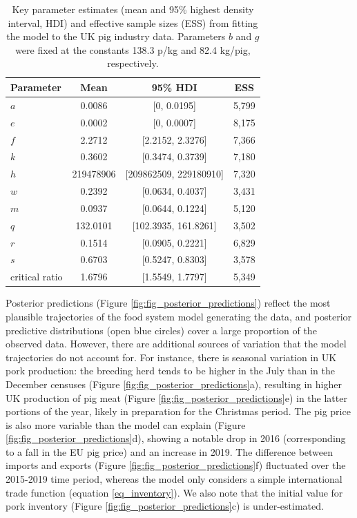 \documentclass[9pt,twocolumn,twoside,lineno]{pnas-new}
\begin{document}
\begin{table}[t!]
  \centering
  \footnotesize
  \begin{tabular}{lccc}
    \textbf{Parameter} & \textbf{Mean} & \textbf{95\% HDI} & \textbf{ESS} \\ \midrule
    $a$ & 0.0086 & [0, 0.0195] & 5,799 \\
    $e$ & 0.0002 & [0, 0.0007] & 8,175 \\
    $f$ & 2.2712 & [2.2152, 2.3276] & 7,366 \\
    $k$ & 0.3602 & [0.3474, 0.3739] & 7,180 \\
    $h$ & 219478906 & [209862509, 229180910] & 7,320 \\
    $w$ & 0.2392 & [0.0634, 0.4037] & 3,431 \\
    $m$ & 0.0937 & [0.0644, 0.1224] & 5,120 \\
    $q$ & 132.0101 & [102.3935, 161.8261] & 3,502 \\
    $r$ & 0.1514 & [0.0905, 0.2221] & 6,829 \\
    $s$ & 0.6703 & [0.5247, 0.8303] & 3,578 \\
    critical ratio & 1.6796 & [1.5549, 1.7797] & 5,349 \\
    \bottomrule
  \end{tabular}
  \caption{Key parameter estimates (mean and 95\% highest density interval, HDI) and effective sample sizes (ESS) from fitting the model to the UK pig industry data. Parameters $b$ and $g$ were fixed at the constants 138.3 p/kg and 82.4 kg/pig, respectively.}
  \label{table:table_parameter_estimates}
\end{table}

Posterior predictions (Figure \ref{fig:fig_posterior_predictions}) reflect the most plausible trajectories of the food system model generating the data, and posterior predictive distributions (open blue circles) cover a large proportion of the observed data. However, there are additional sources of variation that the model trajectories do not account for. For instance, there is seasonal variation in UK pork production: the breeding herd tends to be higher in the July than in the December censuses (Figure \ref{fig:fig_posterior_predictions}a), resulting in higher UK production of pig meat (Figure \ref{fig:fig_posterior_predictions}e) in the latter portions of the year, likely in preparation for the Christmas period. The pig price is also more variable than the model can explain (Figure \ref{fig:fig_posterior_predictions}d), showing a notable drop in 2016 (corresponding to a fall in the EU pig price) and an increase in 2019. The difference between imports and exports (Figure \ref{fig:fig_posterior_predictions}f) fluctuated over the 2015-2019 time period, whereas the model only considers a simple international trade function (equation \ref{eq_inventory}). We also note that the initial value for pork inventory (Figure \ref{fig:fig_posterior_predictions}c) is under-estimated.
\end{document}
